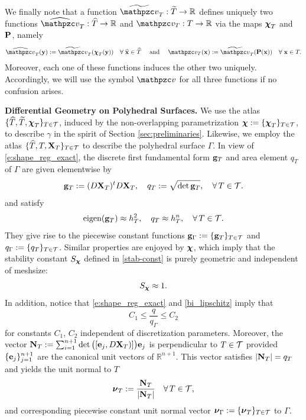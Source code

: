 We finally note that a function $\widetilde \tv_T:\widetilde{T}\to\mathbb R$ defines uniquely two
functions $\widehat{\tv}_T:\widehat{T}\to\mathbb R$ and $\tv_T:T\to\mathbb R$ via the
maps $\boldsymbol{\mathcal{\chi}}_T$ and ${\bf P}$, namely
%
\begin{align}  \label{para_lift}
\widehat{\tv}_T(\by) := \widetilde \tv_T(\exactparam_T(\by)) \quad \forall\; \widehat{\bx}\in
\widehat{T} \quad \text{ and }\quad \tv_T(\bx) := \widetilde \tv_T(\bP(\bx))
\quad\forall\; \bx\in T.
\end{align}
%
Moreover, each one of these functions induces the other two uniquely. Accordingly,
we will use the symbol $\tv$ for all three functions if no confusion arises.


\medskip\noindent
{\bf Differential Geometry on Polyhedral Surfaces.} %
%
We use the  atlas $\{\widehat{T},\widetilde{T},{\boldsymbol \chi}_T\}_{T\in\mathcal{T}}$,
induced by the non-overlapping parametrization ${\boldsymbol \chi}:= \{ {\boldsymbol \chi}_T \}_{T\in \mathcal{T}}$,
to describe $\gamma$ in the spirit of Section \ref{sec:preliminaries}.
Likewise, we employ the atlas $\{\widehat{T},T,{\bf X}_T\}_{T\in\mathcal{T}}$ to describe
the polyhedral surface $\Gamma$.
In view of \eqref{e:shape_reg_exact}, 
the discrete first fundamental form ${\bf g}_T$ and area element $q_T$ of $\Gamma$
are given elementwise by
%
\begin{equation}\label{area}
  {\bf g}_T := (D {\bf X}_T)^t D {\bf X}_T,
  \quad
  q_T := \sqrt{\det{\bf g}_T},
  \quad\forall \, T\in\mathcal{T}.
\end{equation}
%
and satisfy
%
\begin{equation}\label{e:eigen_g}
  \textrm{eigen}({\bf g}_T) \approx h_T^2, \quad  q_T \approx h_T^n,
  \quad\forall \, T\in\mathcal{T}.
\end{equation}
%
They give rise to the piecewise constant functions ${\bf g}_\Gamma:=\{{\bf g}_T\}_{T\in\mathcal{T}}$
and $q_\Gamma:=\{q_T\}_{T\in\mathcal{T}}$. Similar properties are enjoyed by ${\boldsymbol \chi}$, which
imply that the stability constant $S_{\boldsymbol \chi}$ defined in \eqref{stab-const} is purely
geometric and independent of meshsize:
%
\begin{equation}\label{Sapprox1}
S_{\boldsymbol \chi} \approx 1.
\end{equation}
%
In addition, notice that \eqref{e:shape_reg_exact} and \eqref{bi_lipschitz} imply that
\begin{equation}\label{q:nondegen:assume}
C_1 \le \frac{q}{q_\Gamma} \le C_2
\end{equation}
for constants $C_1$, $C_2$ independent of discretization parameters.
%
Moreover, the
vector ${\bf N}_T := \sum_{i=1}^{n+1} \det\big([{\bf e}_j, D {\bf X}_T)]\big) {\bf e}_j$
is perpendicular to $T\in\mathcal{T}$
provided $\{ {\bf e}_j \}_{j=1}^{n+1}$ are the canonical unit vectors of $\mathbb R^{n+1}$.
This vector satisfies $|{\bf N}_T|=q_T$ and yields the unit normal to $T$
%
\[
{\boldsymbol \nu}_T := \frac{{\bf N}_T}{|{\bf N}_T|}
\quad\forall \, T\in\mathcal{T},
\]
%
and corresponding piecewise constant unit normal vector
${\boldsymbol \nu}_\Gamma := \{ {\boldsymbol \nu}_T \}_{T \in \mathcal{T}}$ to $\Gamma$.

